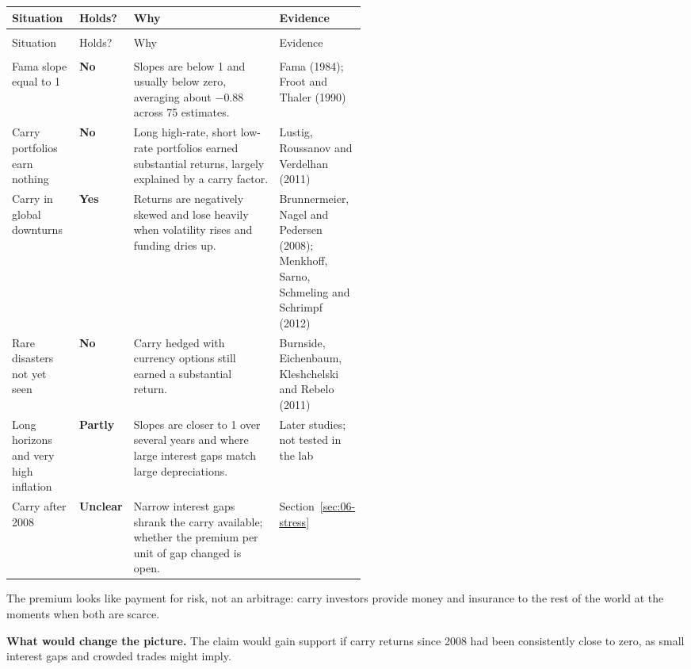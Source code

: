 {\small
\begin{longtable}{@{}>{\raggedright\arraybackslash}p{0.19\linewidth}>{\raggedright\arraybackslash}p{0.10\linewidth}>{\raggedright\arraybackslash}p{}>{\raggedright\arraybackslash}p{0.23\linewidth}@{}}
\toprule
Situation & Holds? & Why & Evidence \\
\midrule
\endfirsthead
\multicolumn{4}{@{}l}{\emph{(continued)}} \\
\toprule
Situation & Holds? & Why & Evidence \\
\midrule
\endhead
\midrule
\multicolumn{4}{r@{}}{\emph{(continued on the next page)}} \\
\endfoot
\bottomrule
\endlastfoot
Fama slope equal to 1 & \textbf{No} & Slopes are below 1 and usually below zero, averaging about $-0.88$ across 75 estimates. & Fama (1984); Froot and Thaler (1990) \\
\addlinespace[3pt]
Carry portfolios earn nothing & \textbf{No} & Long high-rate, short low-rate portfolios earned substantial returns, largely explained by a carry factor. & Lustig, Roussanov and Verdelhan (2011) \\
\addlinespace[3pt]
Carry in global downturns & \textbf{Yes} & Returns are negatively skewed and lose heavily when volatility rises and funding dries up. & Brunnermeier, Nagel and Pedersen (2008); Menkhoff, Sarno, Schmeling and Schrimpf (2012) \\
\addlinespace[3pt]
Rare disasters not yet seen & \textbf{No} & Carry hedged with currency options still earned a substantial return. & Burnside, Eichenbaum, Kleshchelski and Rebelo (2011) \\
\addlinespace[3pt]
Long horizons and very high inflation & \textbf{Partly} & Slopes are closer to 1 over several years and where large interest gaps match large depreciations. & Later studies; not tested in the lab \\
\addlinespace[3pt]
Carry after 2008 & \textbf{Unclear} & Narrow interest gaps shrank the carry available; whether the premium per unit of gap changed is open. & Section~\ref{sec:06-stress} \\
\end{longtable}
}

The premium looks like payment for risk, not an arbitrage: carry investors provide money and insurance to the rest of the world at the moments when both are scarce.

\textbf{What would change the picture.} The claim would gain support if carry returns since 2008 had been consistently close to zero, as small interest gaps and crowded trades might imply.

